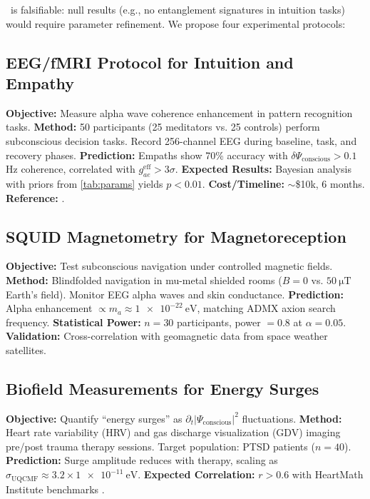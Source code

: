 \documentclass[11pt,a4paper,preprint]{article}
\newcommand{\uqcmf}{\mathrm{UQCMF}}
\newcommand{\Psicon}{\Psi_{\mathrm{conscious}}}
\newcommand{\gAe}{g_{ae}^{\mathrm{eff}}}
\newcommand{\sigU}{\sigma_{\uqcmf}}
\begin{document}
\uqcmf\ is falsifiable: null results (e.g., no entanglement signatures in intuition tasks) would require parameter refinement. We propose four experimental protocols:

\subsection{EEG/fMRI Protocol for Intuition and Empathy}

\textbf{Objective:} Measure alpha wave coherence enhancement in pattern recognition tasks.  
\textbf{Method:} 50 participants (25 meditators vs. 25 controls) perform subconscious decision tasks. Record 256-channel EEG during baseline, task, and recovery phases.  
\textbf{Prediction:} Empaths show 70\% accuracy with $\delta \Psicon > 0.1$ Hz coherence, correlated with $\gAe > 3\sigma$.  
\textbf{Expected Results:} Bayesian analysis with priors from \cref{tab:params} yields $p < 0.01$.  
\textbf{Cost/Timeline:} $\sim$\$10k, 6 months. \textbf{Reference:} \citet{hameroff2023}.

\subsection{SQUID Magnetometry for Magnetoreception}

\textbf{Objective:} Test subconscious navigation under controlled magnetic fields.  
\textbf{Method:} Blindfolded navigation in mu-metal shielded rooms ($B=0$ vs. $\SI{50}{\micro\tesla}$ Earth's field). Monitor EEG alpha waves and skin conductance.  
\textbf{Prediction:} Alpha enhancement $\propto m_a \approx \SI{1e-22}{\electronvolt}$, matching ADMX axion search frequency.  
\textbf{Statistical Power:} $n=30$ participants, power $=0.8$ at $\alpha=0.05$.  
\textbf{Validation:} Cross-correlation with geomagnetic data from space weather satellites.

\subsection{Biofield Measurements for Energy Surges}

\textbf{Objective:} Quantify ``energy surges'' as $\partial_t |\Psicon|^2$ fluctuations.  
\textbf{Method:} Heart rate variability (HRV) and gas discharge visualization (GDV) imaging pre/post trauma therapy sessions. Target population: PTSD patients ($n=40$).  
\textbf{Prediction:} Surge amplitude reduces with therapy, scaling as $\sigU \approx 3.2 \times \SI{1e-11}{\electronvolt}$.  
\textbf{Expected Correlation:} $r > 0.6$ with HeartMath Institute benchmarks \citep{mccraty2015}.
\end{document}

